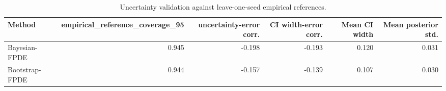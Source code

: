 \begin{table}[t]
\centering
\caption{Uncertainty validation against leave-one-seed empirical references.}
\label{tab:uncertainty_validation}
\begin{tabular}{l r r r r r}
        \hline
        Method & empirical\_reference\_coverage\_95 & uncertainty-error corr. & CI width-error corr. & Mean CI width & Mean posterior std. \\
        \hline
        Bayesian-FPDE & 0.945 & -0.198 & -0.193 & 0.120 & 0.031 \\
        Bootstrap-FPDE & 0.944 & -0.157 & -0.139 & 0.107 & 0.030 \\
        \hline
\end{tabular}
\end{table}
